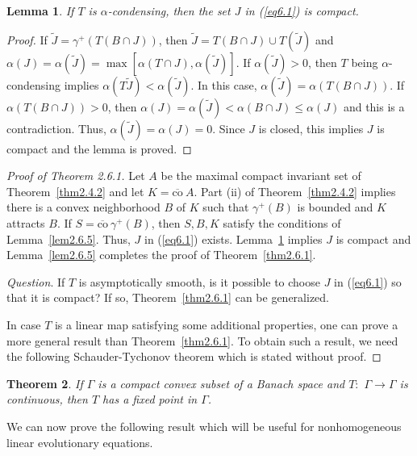 \documentclass{surv-l}
\theoremstyle{plain}
\newtheorem{theorem}{Theorem}[section]
\newtheorem{lemma}[theorem]{Lemma}
\theoremstyle{definition}
\numberwithin{equation}{section}
\numberwithin{figure}{chapter}
\begin{document}
\begin{lemma}\label{lem2.6.6} If $T$ is $\alpha$-condensing, then the set $J$ in \emph{(\ref{eq6.1})} is compact.
\end{lemma}

\begin{proof} If $\tilde{J}=\gamma^{+}(T(B\cap J))$, then $\tilde{J}=T(B\cap J)\cup T(\tilde{J})$ and $\alpha(J)= \alpha(\tilde{J})=\max[\alpha(T\cap J), \alpha(\tilde{J})]$. If $\alpha(\tilde{J})>0$, then $T$ being $\alpha$-condensing implies $\alpha(T\tilde{J})<\alpha(\tilde{J})$. In this case, $\alpha(\tilde{J})=\alpha(T(B\cap J))$. If $\alpha(T(B\cap J))>0$, then $\alpha(J)=\alpha(\tilde{J})<\alpha(B\cap J)\leq\alpha(J)$ and this is a contradiction. Thus, $\alpha(\tilde{J})=\alpha(J)=0$. Since $J$ is closed, this implies $J$ is compact and the lemma is proved.
\end{proof}

\begin{proof}[Proof of Theorem 2.6.1]\label{pot2.6.1} Let $A$ be the maximal compact invariant set of Theorem~\ref{thm2.4.2} and let $K=\overline{\mathrm{co}}\ A$. Part (ii) of Theorem~\ref{thm2.4.2} implies there is a convex neighborhood $B$ of $K$ such that $\gamma^{+}(B)$ is bounded and $K$ attracts $B$. If $S=\overline{\mathrm{co}}\ \gamma^{+}(B)$, then $S, B, K$ satisfy the conditions of Lemma~\ref{lem2.6.5}. Thus, $J$ in (\ref{eq6.1}) exists. Lemma~\ref{lem2.6.6} implies $J$ is compact and Lemma~\ref{lem2.6.5} completes the proof of Theorem~\ref{thm2.6.1}.

\emph{Question}. If $T$ is asymptotically smooth, is it possible to choose $J$ in (\ref{eq6.1}) so that it is compact? If so, Theorem~\ref{thm2.6.1} can be generalized.

In case $T$ is a linear map satisfying some additional properties, one can prove a more general result than Theorem~\ref{thm2.6.1}. To obtain such a result, we need the following Schauder-Tychonov theorem which is stated without proof.
\end{proof}

\begin{theorem}\label{thm2.6.7} If $\Gamma$ is a compact convex subset of a Banach space and $T:$ $\Gamma\rightarrow\Gamma$ is continuous, then $T$ has a fixed point in $\Gamma$.
\end{theorem}

We can now prove the following result which will be useful for nonhomogeneous linear evolutionary equations.
\end{document}
